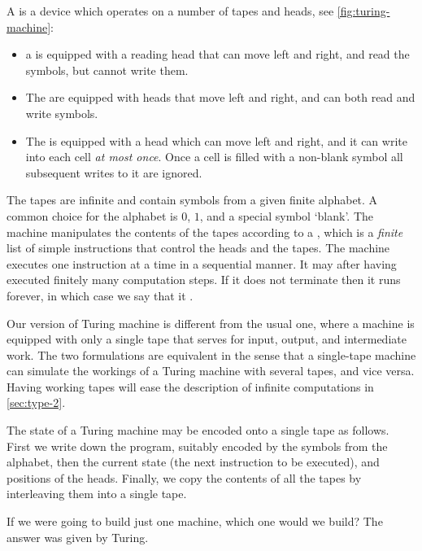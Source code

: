 A  is a device which operates on a number of tapes and
heads, see \cref{fig:turing-machine}:
%
\begin{itemize}
\item a  is equipped with a reading head that can move left and right, and read the symbols, but cannot write them.
\item The  are equipped with heads that move left and right, and can both read and write symbols.
\item The  is equipped with a head which can
  move left and right, and it can write into each cell \emph{at most once}.
  Once a cell is filled with a non-blank symbol all subsequent writes
  to it are ignored.
\end{itemize}
%
The tapes are infinite and contain
symbols from a given finite alphabet. A common choice for the alphabet
is $0$, $1$, and a special symbol `blank'. The machine manipulates the
contents of the tapes according to a , which is a \emph{finite}
list of simple instructions that control the heads and the tapes. The
machine executes one instruction at a time in a sequential manner. It
may  after having executed finitely many computation
steps. If it does not terminate then it runs forever, in which case we
say that it .

Our version of Turing machine is different from the usual one, where a
machine is equipped with only a single tape that serves for input,
output, and intermediate work. The two formulations are equivalent in
the sense that a single-tape machine can simulate the workings of a
Turing machine with several tapes, and vice versa. Having working tapes will
ease the description of infinite computations in \cref{sec:type-2}.

The state of a Turing machine may be encoded onto a single tape as
follows. First we write down the program, suitably encoded by the
symbols from the alphabet, then the current state (the next
instruction to be executed), and positions of the heads. Finally, we
copy the contents of all the tapes by interleaving them into a single
tape.

If we were going to build just one machine, which one would we build?
The answer was given by Turing.


